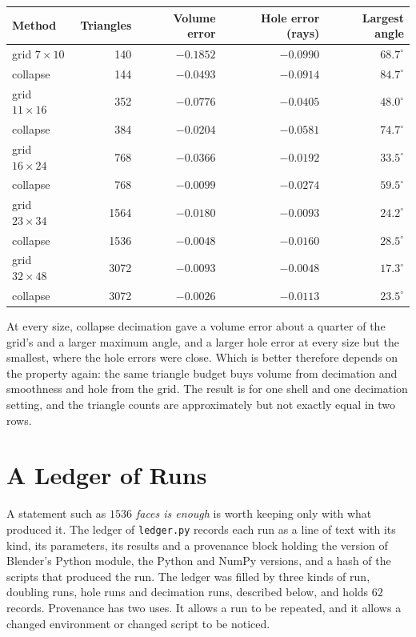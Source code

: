 \begin{center}
\small
\begin{tabular}{lrrrr}
\toprule
Method & Triangles & Volume error & Hole error (rays) & Largest angle\\
\midrule
grid $7\times 10$ & 140 & $-0.1852$ & $-0.0990$ & $68.7^{\circ}$\\
collapse & 144 & $-0.0493$ & $-0.0914$ & $84.7^{\circ}$\\
grid $11\times 16$ & 352 & $-0.0776$ & $-0.0405$ & $48.0^{\circ}$\\
collapse & 384 & $-0.0204$ & $-0.0581$ & $74.7^{\circ}$\\
grid $16\times 24$ & 768 & $-0.0366$ & $-0.0192$ & $33.5^{\circ}$\\
collapse & 768 & $-0.0099$ & $-0.0274$ & $59.5^{\circ}$\\
grid $23\times 34$ & 1564 & $-0.0180$ & $-0.0093$ & $24.2^{\circ}$\\
collapse & 1536 & $-0.0048$ & $-0.0160$ & $28.5^{\circ}$\\
grid $32\times 48$ & 3072 & $-0.0093$ & $-0.0048$ & $17.3^{\circ}$\\
collapse & 3072 & $-0.0026$ & $-0.0113$ & $23.5^{\circ}$\\
\bottomrule
\end{tabular}
\end{center}

At every size, collapse decimation gave a volume error about a quarter of the grid's and a larger maximum angle, and a larger hole error at every size but the smallest, where the hole errors were close. Which is better therefore depends on the property again: the same triangle budget buys volume from decimation and smoothness and hole from the grid. The result is for one shell and one decimation setting, and the triangle counts are approximately but not exactly equal in two rows.

\section{A Ledger of Runs}

A statement such as \emph{$1536$ faces is enough} is worth keeping only with what produced it. The ledger of \texttt{ledger.py} records each run as a line of text with its kind, its parameters, its results and a provenance block holding the version of Blender's Python module, the Python and NumPy versions, and a hash of the scripts that produced the run. The ledger was filled by three kinds of run, doubling runs, hole runs and decimation runs, described below, and holds $62$ records. Provenance has two uses. It allows a run to be repeated, and it allows a changed environment or changed script to be noticed.

